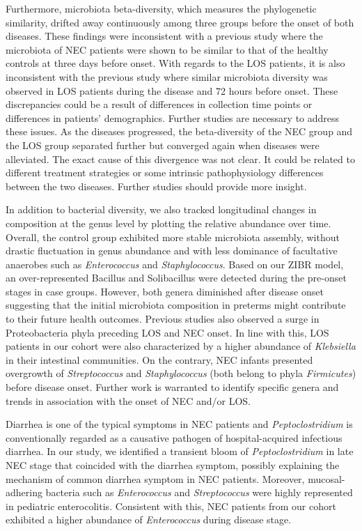 \documentclass[fleqn,10pt, lineno]{wlpeerj} %
\begin{document}
Furthermore, microbiota beta-diversity, which measures the phylogenetic similarity, drifted away continuously among three groups before the onset of both diseases. These findings were inconsistent with a previous study where the microbiota of NEC patients were shown to be similar to that of the healthy controls at three days before onset\citep{mai2011fecal}. With regards to the LOS patients, it is also inconsistent with the previous study where similar microbiota diversity was observed in LOS patients during the disease and 72 hours before onset\citep{mai2013distortions}. These discrepancies could be a result of differences in collection time points or differences in patients’ demographics.  Further studies are necessary to address these issues.  As the diseases progressed, the beta-diversity of the NEC group and the LOS group separated further but converged again when diseases were alleviated. The exact cause of this divergence was not clear. It could be related to different treatment strategies or some intrinsic pathophysiology differences between the two diseases. Further studies should provide more insight.

In addition to bacterial diversity, we also tracked longitudinal changes in composition at the genus level by plotting the relative abundance over time. Overall, the control group exhibited more stable microbiota assembly, without drastic fluctuation in genus abundance and with less dominance of facultative anaerobes such as \textit{Enterococcus} and \textit{Staphylococcus}\citep{gibson2015antibiotics, la2014patterned, grier2017impact}. Based on our ZIBR model, an over-represented Bacillus and Solibacillus were detected during the pre-onset stages in case groups. However, both genera diminished after disease onset suggesting that the initial microbiota composition in preterms might contribute to their future health outcomes. Previous studies also observed a surge in Proteobacteria phyla\citep{mai2013distortions,mai2011fecal} preceding LOS and NEC onset. In line with this, LOS patients in our cohort were also characterized by a higher abundance of \textit{Klebsiella} in their intestinal communities.  On the contrary, NEC infants presented overgrowth of \textit{Streptococcus} and \textit{Staphylococcus} (both belong to phyla \textit{Firmicutes}) before disease onset. Further work is warranted to identify specific genera and trends in association with the onset of NEC and/or LOS.

Diarrhea is one of the typical symptoms in NEC patients and \textit{Peptoclostridium} is conventionally regarded as a causative pathogen of hospital-acquired infectious diarrhea\citep{rodriguez2016clostridium, pereira2016complete}. In our study, we identified a transient bloom of \textit{Peptoclostridium} in late NEC stage that coincided with the diarrhea symptom, possibly explaining the mechanism of common diarrhea symptom in NEC patients.  Moreover, mucosal-adhering bacteria such as \textit{Enterococcus} and \textit{Streptococcus} were highly represented in pediatric enterocolitis\citep{normann2013intestinal, zhou2016increased}. Consistent with this, NEC patients from our cohort exhibited a higher abundance of \textit{Enterococcus} during disease stage.
\end{document}
